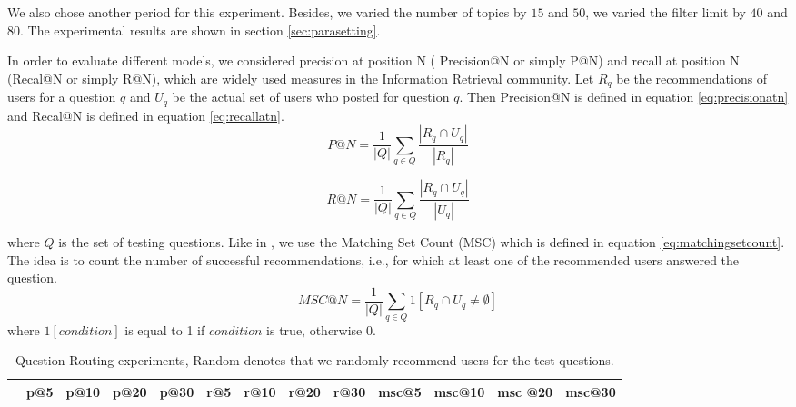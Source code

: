 {{{{{{{We also chose another period for this experiment. Besides, we varied the number of topics by $15$ and $50$, we varied the filter limit by $40$ and $80$. The experimental results are shown in section \ref{sec:parasetting}.

In order to evaluate different models, we considered precision at position N ( Precision@N or simply P@N) and recall at position N (Recal@N or simply R@N), which are widely used measures in the Information Retrieval community. Let $R_q$ be the recommendations of users for a question $q$ and $U_q$ be the actual set of users who posted for question $q$. Then Precision@N is defined in equation \ref{eq:precisionatn} and Recal@N is defined in equation \ref{eq:recallatn}.
\begin{equation}%
 P@N = \frac{1}{|Q|}\sum_{q \in Q}\frac{|R_q \cap U_q|}{|R_q|}
\label{eq:precisionatn}
 \end{equation}
 
 \begin{equation}%
 R@N = \frac{1}{|Q|}\sum_{q \in Q}\frac{|R_q \cap U_q|}{|U_q|}
\label{eq:recallatn}
 \end{equation}

\noindent
where $Q$ is the set of testing questions. Like in \cite{Chang:2013}, we use the Matching Set Count (MSC) which is defined in equation \ref{eq:matchingsetcount}. The idea is to count the number of successful recommendations, i.e., for which at least one of the recommended users answered the question.
 \begin{equation}%
 MSC@N = \frac{1}{|Q|}\sum_{q \in Q} 1[R_q \cap U_q \neq \emptyset]
\label{eq:matchingsetcount}
 \end{equation}
 where $1[condition]$ is equal to 1 if $condition$ is true, otherwise 0. 

\begin{sidewaystable}
\caption{Question Routing experiments, Random denotes that we randomly recommend users for the test questions.}
\label{tab:qrouting}
\centering
\begin{tabular}{|c|c|c|c|c|c|c|c|c|c|c|c|c|}
\hline
 & p@5    &p@10    &p@20   & p@30 &r@5 & r@10 & r@20 &r@30 & msc@5 & msc@10 &msc @20 &msc@30  \\ \hline



\end{tabular}
\end{sidewaystable}}}}}}}}
